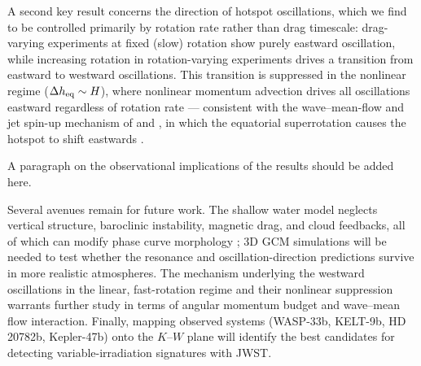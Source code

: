 \documentclass[trackchanges,twocolumn]{aastex7}
\begin{document}
A second key result concerns the direction of hotspot oscillations, which we find to be controlled primarily by rotation rate rather than drag timescale: drag-varying experiments at fixed (slow) rotation show purely eastward oscillation, while increasing rotation in rotation-varying experiments drives a transition from eastward to westward oscillations. This transition is suppressed in the nonlinear regime ($\Delta h_{\rm eq} \sim H$), where nonlinear momentum advection drives all oscillations eastward regardless of rotation rate — consistent with the wave--mean-flow and jet spin-up mechanism of \citet{hammond2018wave} and \citet{tsai2014three}, in which the equatorial superrotation causes the hotspot to shift eastwards \citep{ShowmanPolvani2011}. 

{\color{teal} A paragraph on the observational implications of the results should be added here.}

Several avenues remain for future work. The shallow water model neglects vertical structure, baroclinic instability, magnetic drag, and cloud feedbacks, all of which can modify phase curve morphology \citep{perna2010magnetic, wazny2024hot}; 3D GCM simulations will be needed to test whether the resonance and oscillation-direction predictions survive in more realistic atmospheres. The mechanism underlying the westward oscillations in the linear, fast-rotation regime and their nonlinear suppression warrants further study in terms of angular momentum budget and wave--mean flow interaction. Finally, mapping observed systems (WASP-33b, KELT-9b, HD 20782b, Kepler-47b) onto the $K$--$W$ plane will identify the best candidates for detecting variable-irradiation signatures with JWST.


\end{document}
